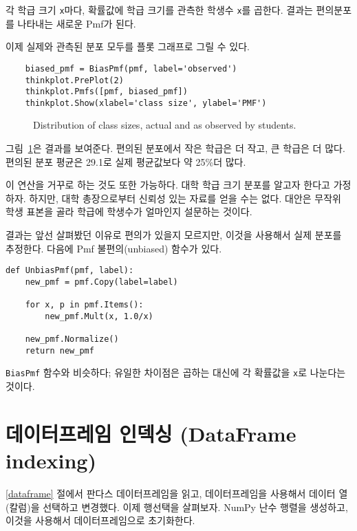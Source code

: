각 학급 크기 {\tt x}마다, 확률값에 학급 크기를 관측한 학생수 {\tt x}를 곱한다. 결과는 편의분포를 나타내는 새로운 Pmf가 된다.

이제 실제와 관측된 분포 모두를 플롯 그래프로 그릴 수 있다.

\begin{verbatim}
    biased_pmf = BiasPmf(pmf, label='observed')
    thinkplot.PrePlot(2)
    thinkplot.Pmfs([pmf, biased_pmf])
    thinkplot.Show(xlabel='class size', ylabel='PMF')
\end{verbatim}

\begin{figure}
\caption{Distribution of class sizes, actual and as observed by students.}
\label{class_size1}
\end{figure}

그림~\ref{class_size1}은 결과를 보여준다. 편의된 분포에서 작은 학급은 더 작고, 큰 학급은 더 많다. 편의된 분포 평균은 29.1로 실제 평균값보다 약 25\%더 많다. 

이 연산을 거꾸로 하는 것도 또한 가능하다. 대학 학급 크기 분포를 알고자 한다고 가정하자. 하지만, 대학 총장으로부터 신뢰성 있는 자료를 얻을 수는 없다. 대안은 무작위 학생 표본을 골라 학급에 학생수가 얼마인지 설문하는 것이다.

결과는 앞선 살펴봤던 이유로 편의가 있을지 모르지만, 이것을 사용해서 실제 분포를 추정한다. 다음에 Pmf 불편의(unbiased) 함수가 있다. 

\begin{verbatim}
def UnbiasPmf(pmf, label):
    new_pmf = pmf.Copy(label=label)

    for x, p in pmf.Items():
        new_pmf.Mult(x, 1.0/x)
        
    new_pmf.Normalize()
    return new_pmf
\end{verbatim}

{\tt BiasPmf} 함수와 비슷하다; 유일한 차이점은 곱하는 대신에 각 확률값을 {\tt x}로 나눈다는 것이다.

\section{데이터프레임 인덱싱 (DataFrame indexing)}

\ref{dataframe} 절에서 판다스 데이터프레임을 읽고, 데이터프레임을 사용해서 데이터 열(칼럼)을 선택하고 변경했다. 
이제 행선택을 살펴보자.
NumPy 난수 행렬을 생성하고, 이것을 사용해서 데이터프레임으로 초기화한다.

